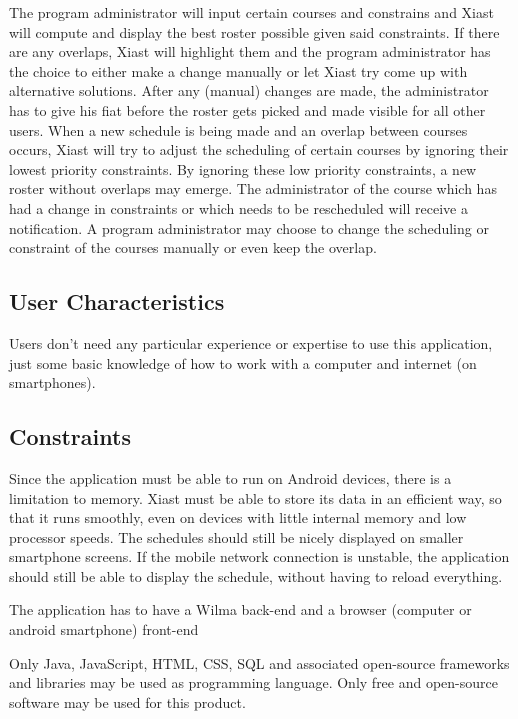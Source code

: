 \documentclass[12pt]{article}
\begin{document}
The program administrator will input certain courses and constrains and
Xiast will compute and display the best roster possible given said
constraints. If there are any overlaps, Xiast will highlight them and
the program administrator has the choice to either make a change
manually or let Xiast try come up with alternative solutions. After any
(manual) changes are made, the administrator has to give his fiat before
the roster gets picked and made visible for all other users. When a new
schedule is being made and an overlap between courses occurs, Xiast will
try to adjust the scheduling of certain courses by ignoring their lowest
priority constraints. By ignoring these low priority constraints, a new
roster without overlaps may emerge. The administrator of the course
which has had a change in constraints or which needs to be rescheduled
will receive a notification. A program administrator may choose to
change the scheduling or constraint of the courses manually or even keep
the overlap.

\subsection{User Characteristics}\label{user-characteristics}

Users don't need any particular experience or expertise to use this
application, just some basic knowledge of how to work with a computer
and internet (on smartphones).

\subsection{Constraints}\label{constraints}

Since the application must be able to run on Android devices, there is a
limitation to memory. Xiast must be able to store its data in an
efficient way, so that it runs smoothly, even on devices with little
internal memory and low processor speeds. The schedules should still be
nicely displayed on smaller smartphone screens. If the mobile network
connection is unstable, the application should still be able to display
the schedule, without having to reload everything.

The application has to have a Wilma back-end and a browser (computer or
android smartphone) front-end

Only Java, JavaScript, HTML, CSS, SQL and associated open-source
frameworks and libraries may be used as programming language. Only free
and open-source software may be used for this product.
\end{document}
